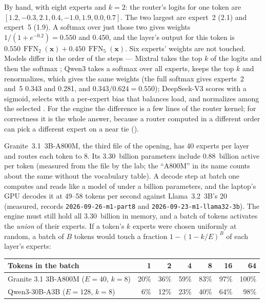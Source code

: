 By hand, with eight experts and $k = 2$: the router's logits for one token are
$[1.2, -0.3, 2.1, 0.4, -1.0, 1.9, 0.0, 0.7]$. The two largest are expert~2
(2.1) and expert~5 (1.9). A softmax over just those two gives weights
$1/(1 + e^{-0.2}) = 0.550$ and $0.450$, and the layer's output for this token
is $0.550\,\operatorname{FFN}_2(\mathbf{x}) + 0.450\,\operatorname{FFN}_5(\mathbf{x})$.
Six experts' weights are not touched. Models differ in the order of the
steps --- Mixtral takes the top $k$ of the logits and then the softmax
\cite{jiang2024mixtral}; Qwen3 takes a softmax over all experts, keeps the top
$k$ and renormalizes, which gives the same weights (the full softmax gives
experts~2 and~5 0.343 and 0.281, and $0.343/0.624 = 0.550$); DeepSeek-V3 scores
with a sigmoid, selects with a per-expert bias that balances load, and
normalizes among the selected \cite{deepseek2024v3}. For the engine the
difference is a few lines of the router kernel; for correctness it is the whole
answer, because a router computed in a different order can pick a different
expert on a near tie ().

Granite~3.1~3B-A800M, the third file of the opening, has 40 experts per layer
and routes each token to 8. Its 3.30~billion parameters include 0.88~billion
active per token (measured from the file by the lab; the ``A800M'' in its name
counts about the same without the vocabulary table). A decode step at batch one
computes and reads like a model of under a billion parameters, and the laptop's
GPU decodes it at 49--58 tokens per second against Llama~3.2~3B's 20 (measured,
records \texttt{2026-09-26-m1-part8} and \texttt{2026-09-23-m1-llama32-3b}).
The engine must still hold all 3.30~billion in memory, and a batch of tokens
activates the \emph{union} of their experts. If a token's $k$ experts were
chosen uniformly at random, a batch of $B$ tokens would touch a fraction
$1 - (1 - k/E)^B$ of each layer's experts:

\begin{center}\small
\begin{tabular}{@{}lrrrrrr@{}}
\toprule
Tokens in the batch & 1 & 2 & 4 & 8 & 16 & 64 \\
\midrule
Granite 3.1 3B-A800M ($E = 40$, $k = 8$) & 20\% & 36\% & 59\% & 83\% & 97\% & 100\% \\
Qwen3-30B-A3B ($E = 128$, $k = 8$) & 6\% & 12\% & 23\% & 40\% & 64\% & 98\% \\
\bottomrule
\end{tabular}
\end{center}

